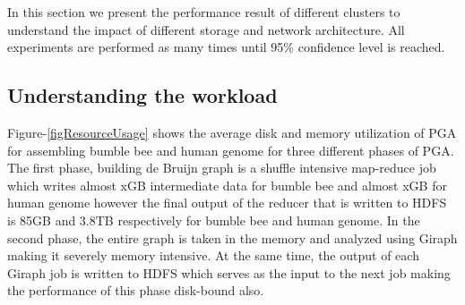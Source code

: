 In this section we present the performance result of different clusters to understand the impact of different storage and network architecture.
All experiments are performed as many times until 95\% confidence level is reached.

\subsection {Understanding the workload}
Figure-\ref{figResourceUsage} shows the average disk and memory utilization of PGA for assembling bumble bee and human genome for three different phases of PGA.
The first phase, building de Bruijn graph is a shuffle intensive map-reduce job which writes almost xGB intermediate data for bumble bee and almost xGB for human genome however the final output of the reducer that is written to HDFS is 85GB and 3.8TB respectively for bumble bee and human genome.
In the second phase, the entire graph is taken in the memory and analyzed using Giraph making it severely memory intensive.
At the same time, the output of each Giraph job is written to HDFS which serves as the input to the next job making the performance of this phase disk-bound also.

